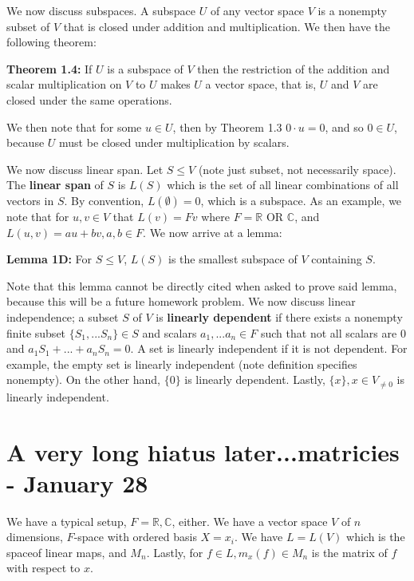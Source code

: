 \documentclass{report}
\begin{document}
We now discuss subspaces. A subspace $U$ of any vector space $V$ is a nonempty subset of $V$ that is closed under addition and multiplication. We then have the following theorem:

\begin{center}
\textbf{Theorem 1.4:} If $U$ is a subspace of $V$ then the restriction of the addition and scalar multiplication on $V$ to $U$ makes $U$ a vector space, that is, $U$ and $V$ are closed under the same operations.
\end{center}

We then note that for some $u\in U$, then by Theorem 1.3 $0\cdot u = 0$, and so $0 \in U$, because $U$ must be closed under multiplication by scalars. 

We now discuss linear span. Let $S \leq V$ (note just subset, not necessarily space). The \textbf{linear span} of $S$ is $L(S)$ which is the set of all linear combinations of all  vectors in $S$. By convention, $L(\emptyset) = 0$, which is a subspace. As an example, we note that for $u, v \in V$ that $L(v) = Fv$ where $F = \mathbb{R}$ OR $\mathbb{C}$, and $L(u,v) = au + bv, a,b \in F$. We now arrive at a lemma:

\begin{center}
\textbf{Lemma 1D:} For $S \leq V$, $L(S)$ is the smallest subspace of $V$ containing $S$.
\end{center}

Note that this lemma cannot be directly cited when asked to prove said lemma, because this will be a future homework problem. We now discuss linear independence; a subset $S$ of $V$ is \textbf{linearly dependent} if there exists a nonempty finite subset $\{S_1,...S_n\} \in S$ and scalars $a_1,...a_n \in F$ such that not all scalars are $0$ and $a_1S_1 +...+ a_nS_n = 0$. A set is linearly independent if it is not dependent. For example, the empty set is linearly independent (note definition specifies nonempty). On the other hand, $\{0\}$ is linearly dependent. Lastly, $\{x\}, x \in V_{\neq 0}$ is linearly independent. 

\chapter{A very long hiatus later...matricies - January 28}

We have a typical setup, $F = \mathbb{R}, \mathbb{C}$, either. We have a vector space $V$ of $n$ dimensions, $F$-space with ordered basis $X = x_i$. We have $L = L(V)$ which is the spaceof linear maps, and $M_n$. Lastly, for $f \in L, m_x(f)\in M_n$ is the matrix of $f$ with respect to $x$.
\end{document}
